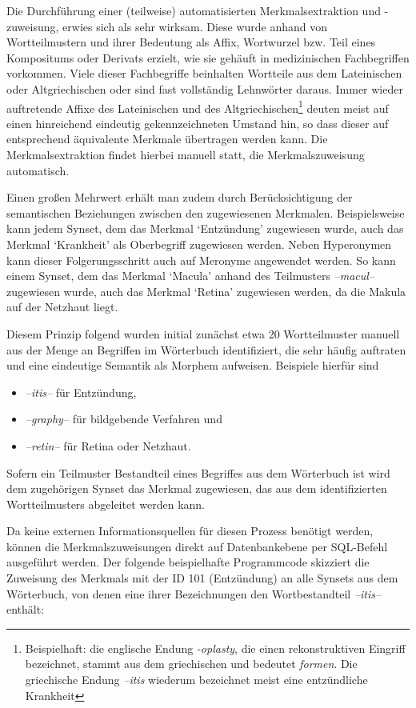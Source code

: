 \documentclass[pagesize,DIV=calc,12pt,draft]{scrreprt}
\begin{document}
Die Durchführung einer (teilweise) automatisierten Merkmalsextraktion
und -zuweisung, erwies sich als sehr wirksam. Diese wurde anhand von
Wortteilmustern und ihrer Bedeutung als Affix, Wortwurzel bzw. Teil
eines Kompositums oder Derivats erzielt, wie sie gehäuft in
medizinischen Fachbegriffen vorkommen. Viele dieser Fachbegriffe
beinhalten Wortteile aus dem Lateinischen oder Altgriechischen oder sind
fast vollständig Lehnwörter daraus. Immer wieder auftretende Affixe des
Lateinischen und des Altgriechischen\footnote{Beispielhaft: die englische Endung \emph{-oplasty}, die einen rekonstruktiven Eingriff bezeichnet, stammt aus dem griechischen und bedeutet \emph{formen}. Die griechische Endung \emph{--itis} wiederum bezeichnet meist eine entzündliche Krankheit} deuten meist auf einen hinreichend eindeutig gekennzeichneten Umstand hin, so dass dieser auf entsprechend äquivalente Merkmale übertragen werden kann. Die Merkmalsextraktion findet hierbei manuell statt, die Merkmalszuweisung
automatisch.

Einen großen Mehrwert erhält man zudem durch Berücksichtigung der
semantischen Beziehungen zwischen den zugewiesenen Merkmalen.
Beispielsweise kann jedem Synset, dem das Merkmal `Entzündung'
zugewiesen wurde, auch das Merkmal `Krankheit' als Oberbegriff
zugewiesen werden. Neben Hyperonymen kann dieser Folgerungsschritt auch
auf Meronyme angewendet werden. So kann einem Synset, dem das Merkmal
`Macula' anhand des Teilmusters \emph{--macul--} zugewiesen wurde, auch das
Merkmal `Retina' zugewiesen werden, da die Makula auf der Netzhaut
liegt.

Diesem Prinzip folgend wurden initial zunächst etwa 20 Wortteilmuster
manuell aus der Menge an Begriffen im Wörterbuch identifiziert, die sehr
häufig auftraten und eine eindeutige Semantik als Morphem aufweisen.
Beispiele hierfür sind

\begin{itemize}
\item
  \emph{--itis--} für Entzündung,
\item
  \emph{--graphy--} für bildgebende Verfahren und
\item
  \emph{--retin--} für Retina oder Netzhaut.
\end{itemize}

Sofern ein Teilmuster Bestandteil eines Begriffes aus dem Wörterbuch ist
wird dem zugehörigen Synset das Merkmal zugewiesen, das aus dem
identifizierten Wortteilmusters abgeleitet werden kann.

Da keine externen Informationsquellen für diesen Prozess benötigt
werden, können die Merkmalszuweisungen direkt auf Datenbankebene per
SQL-Befehl ausgeführt werden. Der folgende beispielhafte Programmcode
skizziert die Zuweisung des Merkmals mit der ID 101 (Entzündung) an alle
Synsets aus dem Wörterbuch, von denen eine ihrer Bezeichnungen den
Wortbestandteil \emph{--itis--} enthält:
\end{document}
